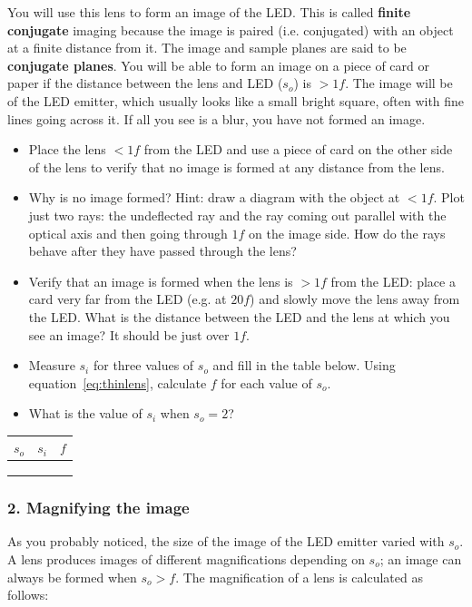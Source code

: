 \documentclass[a4paper]{report}
\begin{document}
You will use this lens to form an image of the LED.
This is called \textbf{finite conjugate} imaging because the image is paired (i.e. conjugated) with an object at a finite distance from it.
The image and sample planes are said to be \textbf{conjugate planes}.
You will be able to form an image on a piece of card or paper if the distance between the lens and LED ($s_o$) is $>1f$.
The image will be of the LED emitter, which  usually looks like a small bright square, often with fine lines going across it. 
If all you see is a blur, you have not formed an image.

\begin{itemize}
\item Place the lens $<1f$ from the LED and use a piece of card on the other side of the lens to verify that no image is formed at any distance from the lens.
\item Why is no image formed? 
Hint: draw a diagram with the object at $<1f$. Plot just two rays: the undeflected ray and the ray coming out parallel with the optical axis and then going through $1f$ on the image side. 
How do the rays behave after they have passed through the lens?
\item Verify that an image is formed when the lens is $>1f$ from the LED: place a card very far from the LED (e.g. at $20f$) and slowly move the lens away from the LED. 
What is the distance between the LED and the lens at which you see an image? 
It should be just over $1f$.
\item Measure $s_i$ for three values of $s_o$ and fill in the table below. 
Using equation~\ref{eq:thinlens}, calculate $f$ for each value of $s_o$.
\item What is the value of $s_i$ when $s_o=2$?
\end{itemize}

\vspace{2em}
\begin{tabular}{| p{1cm} | p{1cm} | p{1cm} |}
\hline
 $s_o$  &  $s_i$  &  $f$  \\
\hline
\hline
 & & \\ \hline
 & & \\ \hline
 & & \\ \hline
\end{tabular}


\clearpage

\subsubsection{2. Magnifying the image}
As you probably noticed, the size of the image of the LED emitter varied with $s_o$.
A lens produces images of different magnifications depending on $s_o$; an image can always be formed when $s_o>f$. 
The magnification of a lens is calculated as follows:
\end{document}
